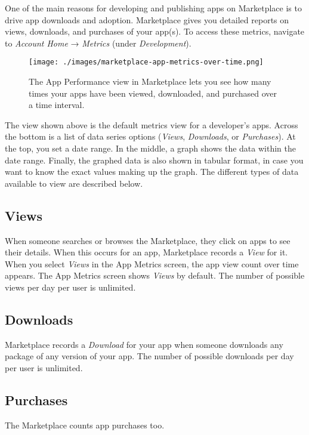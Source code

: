 One of the main reasons for developing and publishing apps on
Marketplace is to drive app downloads and adoption. Marketplace gives
you detailed reports on views, downloads, and purchases of your app(s).
To access these metrics, navigate to \emph{Account Home} →
\emph{Metrics} (under \emph{Development}).

\begin{figure}
\centering
\texttt{[image: ./images/marketplace-app-metrics-over-time.png]}
\caption{The App Performance view in Marketplace lets you see how many
times your apps have been viewed, downloaded, and purchased over a time
interval.}
\end{figure}

The view shown above is the default metrics view for a developer's apps.
Across the bottom is a list of data series options (\emph{Views},
\emph{Downloads}, or \emph{Purchases}). At the top, you set a date
range. In the middle, a graph shows the data within the date range.
Finally, the graphed data is also shown in tabular format, in case you
want to know the exact values making up the graph. The different types
of data available to view are described below.

\subsection{Views}\label{views}

When someone searches or browses the Marketplace, they click on apps to
see their details. When this occurs for an app, Marketplace records a
\emph{View} for it. When you select \emph{Views} in the App Metrics
screen, the app view count over time appears. The App Metrics screen
shows \emph{Views} by default. The number of possible views per day per
user is unlimited.

\subsection{Downloads}\label{downloads}

Marketplace records a \emph{Download} for your app when someone
downloads any package of any version of your app. The number of possible
downloads per day per user is unlimited.

\subsection{Purchases}\label{purchases}

The Marketplace counts app purchases too.


